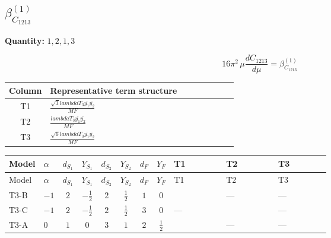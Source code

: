 \documentclass[8pt]{article}
\begin{document}
\begin{landscape}
\section*{$\beta_{C_{1213}}^{(1)}$}
\noindent\textbf{Quantity: }$\mathrm{1,2,1,3}$\par\smallskip
\[16\pi^2\,\mu\frac{d C_{1213}}{d\mu}=\beta_{C_{1213}}^{(1)}\]
\begin{center}
\begin{tabular}{@{}c >{\raggedright\arraybackslash}p{0.82\linewidth}@{}}
\toprule
Column & Representative term structure \\
\midrule
T1 & \(\displaystyle \frac{\sqrt{3} lambdaT_{3} \overline{y_{1}} \overline{y_{2}}}{MF}\) \\
\midrule
T2 & \(\displaystyle \frac{lambdaT_{3} \overline{y_{1}} \overline{y_{2}}}{MF}\) \\
\midrule
T3 & \(\displaystyle \frac{\sqrt{6} lambdaT_{3} \overline{y_{1}} \overline{y_{2}}}{MF}\) \\
\midrule
\bottomrule
\end{tabular}
\end{center}
\smallskip
\tiny
\begin{longtable}{@{}llcccccc >{\raggedright\arraybackslash}p{0.21\linewidth} >{\raggedright\arraybackslash}p{0.21\linewidth} >{\raggedright\arraybackslash}p{0.21\linewidth}@{}}
\toprule
Model & $\alpha$ & $d_{S_1}$ & $Y_{S_1}$ & $d_{S_2}$ & $Y_{S_2}$ & $d_F$ & $Y_F$ & T1 & T2 & T3 \\
\midrule
\endfirsthead
\toprule
Model & $\alpha$ & $d_{S_1}$ & $Y_{S_1}$ & $d_{S_2}$ & $Y_{S_2}$ & $d_F$ & $Y_F$ & T1 & T2 & T3 \\
\midrule
\endhead
T3-B & $-1$ & $2$ & $-\frac{1}{2}$ & $2$ & $\frac{1}{2}$ & $1$ & $0$ & \scriptsize\adjustbox{max width=\linewidth}{$\begin{gathered} - \frac{\sqrt{3} lambdaT_{3} \overline{y_{1}} \overline{y_{2}}}{3 MF}\end{gathered}$} & --- & --- \\
\midrule
T3-C & $-1$ & $2$ & $-\frac{1}{2}$ & $2$ & $\frac{1}{2}$ & $3$ & $0$ & --- & \scriptsize\adjustbox{max width=\linewidth}{$\begin{gathered} \frac{lambdaT_{3} \overline{y_{1}} \overline{y_{2}}}{3 MF}\end{gathered}$} & --- \\
\midrule
T3-A & $0$ & $1$ & $0$ & $3$ & $1$ & $2$ & $\frac{1}{2}$ & \scriptsize\adjustbox{max width=\linewidth}{$\begin{gathered} - \frac{\sqrt{3} lambdaT_{3} \overline{y_{1}} \overline{y_{2}}}{3 MF}\end{gathered}$} & --- & --- \\

\end{longtable}
\end{landscape}
\end{document}
